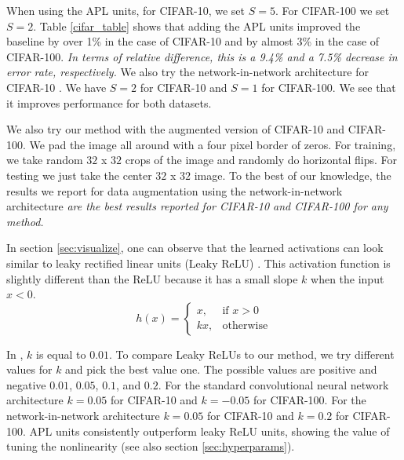 \documentclass{article} \usepackage{iclr2015,times}
\begin{document}
When using the APL units, for CIFAR-10, we set $S=5$. For CIFAR-100 we set $S=2$. Table \ref{cifar_table} shows that adding the APL units improved the baseline by over 1\% in the case of CIFAR-10 and by almost 3\% in the case of CIFAR-100. \textit{In terms of relative difference, this is a 9.4\% and a 7.5\% decrease in error rate, respectively.} We also try the network-in-network architecture for CIFAR-10 \citep{lin2013network}. We have $S=2$ for CIFAR-10 and $S=1$ for CIFAR-100. We see that it improves performance for both datasets.

We also try our method with the augmented version of CIFAR-10 and CIFAR-100. We pad the image all around with a four pixel border of zeros. For training, we take random $32$ x $32$ crops of the image and randomly do horizontal flips. For testing we just take the center $32$ x $32$ image. To the best of our knowledge, the results we report for data augmentation using the network-in-network architecture \textit{are the best results reported for CIFAR-10 and CIFAR-100 for any method.}

In section \ref{sec:visualize}, one can observe that the learned activations can look similar to leaky rectified linear units (Leaky ReLU) \citep{maas2013rectifier}. This activation function is slightly different than the ReLU because it has a small slope $k$ when the input $x<0$.
\[
    h(x)= 
\begin{cases}
    x, & \text{if } x > 0\\
    kx,              & \text{otherwise}
\end{cases}
\]

In \citep{maas2013rectifier}, $k$ is equal to $0.01$. To compare Leaky ReLUs to our method, we try different values for $k$ and pick the best value one. The possible values are positive and negative $0.01$, $0.05$, $0.1$, and $0.2$. For the standard convolutional neural network architecture $k=0.05$ for CIFAR-10 and $k=-0.05$ for CIFAR-100. For the network-in-network architecture $k=0.05$ for CIFAR-10 and $k=0.2$ for CIFAR-100.
APL units consistently outperform leaky ReLU units, showing the value of tuning the nonlinearity (see also section \ref{sec:hyperparams}).
\end{document}
